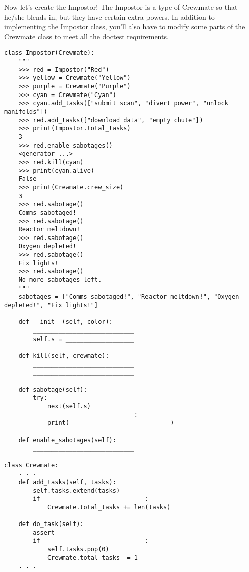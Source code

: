\question Now let's create the Impostor! The Impostor is a type of Crewmate so that he/she blends in, but they have certain extra powers. In addition to implementing the Impostor class, you'll also have to modify some parts of the Crewmate class to meet all the doctest requirements.
\begin{lstlisting}
class Impostor(Crewmate):
    """
    >>> red = Impostor("Red")
    >>> yellow = Crewmate("Yellow")
    >>> purple = Crewmate("Purple")
    >>> cyan = Crewmate("Cyan")
    >>> cyan.add_tasks(["submit scan", "divert power", "unlock manifolds"])
    >>> red.add_tasks(["download data", "empty chute"])
    >>> print(Impostor.total_tasks)
    3
    >>> red.enable_sabotages()
    <generator ...>
    >>> red.kill(cyan)
    >>> print(cyan.alive)
    False
    >>> print(Crewmate.crew_size)
    3
    >>> red.sabotage()
    Comms sabotaged!
    >>> red.sabotage()
    Reactor meltdown!
    >>> red.sabotage()
    Oxygen depleted!
    >>> red.sabotage()
    Fix lights!
    >>> red.sabotage()
    No more sabotages left.
    """
    sabotages = ["Comms sabotaged!", "Reactor meltdown!", "Oxygen depleted!", "Fix lights!"]
    
    def __init__(self, color):
        ____________________________
        self.s = ___________________
    
    def kill(self, crewmate):
        ____________________________
        ____________________________
    
    def sabotage(self):
        try:
            next(self.s)
        ____________________________:
            print(____________________________)
    
    def enable_sabotages(self):
    	____________________________

class Crewmate:
    . . .
    def add_tasks(self, tasks):
        self.tasks.extend(tasks)
        if ____________________________:
            Crewmate.total_tasks += len(tasks)
    
    def do_task(self):
        assert _________________________
        if ____________________________:
            self.tasks.pop(0)
            Crewmate.total_tasks -= 1
    . . .
\end{lstlisting}
